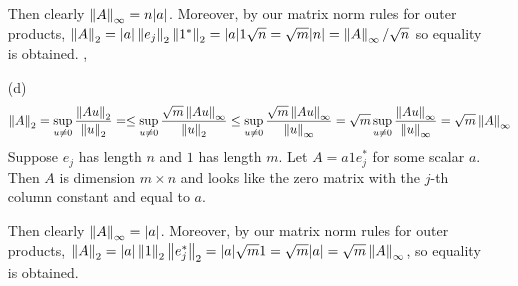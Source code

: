 \documentclass[10pt]{article}
\begin{document}
\begin{solution}[Solution]
\begin{enumerate}
	Then clearly \( \left\lVert A\right\rVert_\infty = n|a| \). Moreover, by our matrix norm rules for outer products, \( \left\lVert A\right\rVert_2 = |a|\left\lVert e_j\right\rVert_2\left\lVert1^*\right\rVert_2 = |a|1\sqrt{n} = \sqrt{m}|n| = \left\lVert A\right\rVert_\infty/\sqrt{n} \) so equality is obtained.	,
	
	
	\item[(d)]
	\[ \left\lVert A\right\rVert_2 = \sup_{u\neq 0}\dfrac{\left\lVert Au\right\rVert_2}{\left\lVert u\right\rVert_2} = \leq \sup_{u\neq0}\dfrac{\sqrt{m}\left\lVert Au\right\rVert_\infty}{\left\lVert u\right\rVert_2} \leq  \sup_{u\neq0}\dfrac{\sqrt{m}\left\lVert Au\right\rVert_\infty}{\left\lVert u\right\rVert_\infty} = \sqrt{m}\sup_{u\neq0}\dfrac{\left\lVert Au\right\rVert_\infty}{\left\lVert u\right\rVert_\infty} = \sqrt{m}\left\lVert A\right\rVert_\infty \]
	Suppose \( e_j \) has length \( n \) and \( 1 \) has length \( m \). Let \( A=a1e_j^* \) for some scalar \( a \). Then \( A \) is dimension \( m\times n \) and looks like the zero matrix with the \( j \)-th column constant and equal to \( a \).
	
	Then clearly \( \left\lVert A\right\rVert_\infty = |a| \). Moreover, by our matrix norm rules for outer products, \( \left\lVert A\right\rVert_2 = |a|\left\lVert1\right\rVert_2\left\lVert e_j^*\right\rVert_2 = |a|\sqrt{m}1 = \sqrt{m}|a| = \sqrt{m}\left\lVert A\right\rVert_\infty \), so equality is obtained.
	
	
\end{enumerate}
\end{solution}
\end{document}
